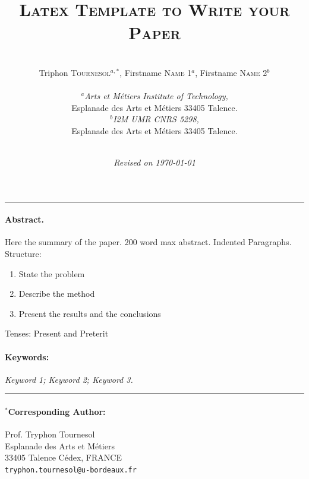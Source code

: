 \documentclass[12pt,a4paper]{article}
\author{\\
Triphon \textsc{Tournesol}$^{a,*}$, Firstname \textsc{Name} 1$^a$, Firstname \textsc{Name} 2$^b$\\ \\
  {\small \textit{$^a$Arts et Métiers Institute of Technology,}}\\
  {\small  Esplanade des Arts et Métiers	 33405 Talence.}\\ 
  {\small  \textit{$^b$I2M UMR CNRS 5298,}}\\
  {\small  Esplanade des Arts et Métiers	 33405 Talence.}\\   \\
   }
\title{{\Large \textsc{Latex Template to Write your Paper}}}
\date{\textit{Revised on \today}}
\begin{document}
\maketitle
\pagestyle{plain}
\fancyhf{} %

\par\noindent\rule{\textwidth}{0.4pt}\vspace{-0.5cm}



\paragraph{Abstract.}

Here the summary of the paper.
200 word max abstract.  Indented Paragraphs. \\
Structure:
\begin{enumerate}
\item	State the problem
\item	Describe the method
\item	Present the results and the conclusions
\end{enumerate}

Tenses: Present and Preterit


\paragraph{Keywords:}
\textit{Keyword 1; Keyword 2; Keyword 3.}


\vspace{-0.2cm}\par\noindent\rule{\textwidth}{0.4pt}

\paragraph{$^*$Corresponding Author:\\}
Prof. Tryphon Tournesol\\
Esplanade des Arts et Métiers\\
33405 Talence Cédex, FRANCE\\
 \texttt{tryphon.tournesol@u-bordeaux.fr}\\
\end{document}
